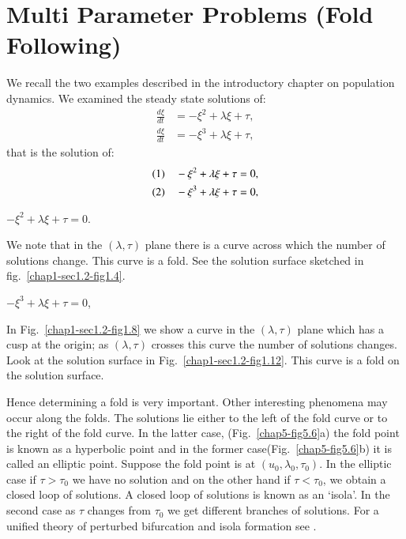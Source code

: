 \section{Multi Parameter Problems (Fold
  Following)}\label{chap5-sec5.34}\pageoriginale%

We recall the two examples described in the introductory chapter on
population dynamics. We examined the steady state solutions of: 
\begin{align*}
\frac{d \xi}{dt} & = - \xi^2 + \lambda \xi + \tau,\\
\frac{d \xi}{dt} & = - \xi^3 + \lambda \xi + \tau , 
\end{align*}
that is the solution of:
\begin{align*}
{\rm(1)} \quad & - \xi^2+ \lambda \xi + \tau=0,\\
{\rm(2)} \quad & - \xi^3+ \lambda \xi + \tau=0,
\end{align*}

\setcounter{exam}{0}
\begin{exam}\label{chap5-exam1}%
$-\xi^2+\lambda \xi + \tau =0$.

We note that in the $(\lambda, \tau )$ plane there is a curve across
which the number of solutions change. This curve is a fold. See the
solution surface sketched in fig.~\ref{chap1-sec1.2-fig1.4}. 
\end{exam}

\begin{exam}\label{chap5-exam2}%
$-\xi^3+ \lambda \xi + \tau=0$,

In Fig.~\ref{chap1-sec1.2-fig1.8} we show a curve in the $(\lambda,
\tau)$ plane which has 
a cusp at the origin; as $(\lambda, \tau)$ crosses this curve the
number of solutions changes. Look at the solution surface in 
Fig.~\ref{chap1-sec1.2-fig1.12}. This curve is a fold on the solution surface. 
\end{exam}

Hence determining a fold is very important. Other interesting
phenomena may occur along the folds. The solutions lie either to the
left of the fold curve or to the right of the fold curve. In the
latter case, (Fig.~\ref{chap5-fig5.6}a) the fold point is known as a hyperbolic
point and in the former case\pageoriginale (Fig.~\ref{chap5-fig5.6}b)
it is called an elliptic 
point. Suppose the fold point is at $(u_0, \lambda_0, \tau_0)$. In the
elliptic case if $\tau> \tau_0$ we have no solution and on the other
hand if $\tau < \tau_0$, we obtain a closed loop of solutions. A
closed loop of solutions is known as an `isola'. In the second case as
$\tau$ changes from $\tau_0$ we get different branches of
solutions. For a unified theory of perturbed bifurcation and isola
formation see \cite{key21}. 

